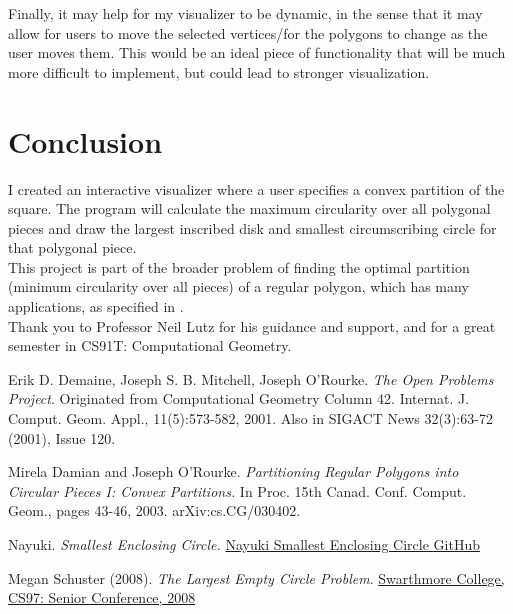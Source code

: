 \documentclass[11pt]{article}
\begin{document}
Finally, it may help for my visualizer to be dynamic, in the sense that it may allow for users to move the selected vertices/for the polygons to change as the user moves them. This would be an ideal piece of functionality
that will be much more difficult to implement, but could lead to stronger visualization.

\section{Conclusion}
I created an interactive visualizer where a user specifies a convex partition of the square. The program will calculate the maximum circularity over all polygonal pieces and draw the largest inscribed disk
and smallest circumscribing circle for that polygonal piece. \\

This project is part of the broader problem of finding the optimal partition (minimum circularity over all pieces) of a regular polygon, which has many applications, as specified in \cite{damian_rourke}. \\

Thank you to Professor Neil Lutz for his guidance and support, and for a great semester in CS91T: Computational Geometry.
\newpage

\begin{thebibliography}{9}
    Erik D. Demaine, Joseph S. B. Mitchell, Joseph O'Rourke. \textit{The Open Problems Project}. 
    Originated from Computational Geometry Column 42. Internat. J. Comput. Geom. Appl., 11(5):573-582, 2001. Also in SIGACT News 32(3):63-72 (2001), Issue 120.

    Mirela Damian and Joseph O'Rourke. \textit{Partitioning Regular Polygons into Circular Pieces I: Convex Partitions.} In Proc. 15th Canad. Conf. Comput. Geom., pages 43-46, 2003. arXiv:cs.CG/030402.    

    Nayuki. \textit{Smallest Enclosing Circle.} \href{https://www.nayuki.io/page/smallest-enclosing-circle}{Nayuki Smallest Enclosing Circle GitHub}

    Megan Schuster (2008). \textit{The Largest Empty Circle Problem}. \href{https://www.cs.swarthmore.edu/~adanner/cs97/s08/papers/schuster.pdf}{Swarthmore College, CS97: Senior Conference, 2008}
\end{thebibliography}
\end{document}
